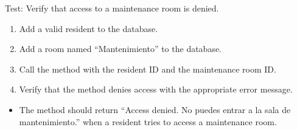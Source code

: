 \documentclass[letterpaper,10pt,english]{sphinxmanual}
\begin{document}
\begin{fulllineitems}
\label{\detokenize{test:test.test_room.test_access_room_maintenance_room}}
\pysigstartsignatures
\pysiglinewithargsret
{}
{}
{}
\pysigstopsignatures
\sphinxAtStartPar
Test: Verify that access to a maintenance room is denied.
\begin{description}
\begin{enumerate}
%
\item {} 
\sphinxAtStartPar
Add a valid resident to the database.

\item {} 
\sphinxAtStartPar
Add a room named “Mantenimiento” to the database.

\item {} 
\sphinxAtStartPar
Call the  method with the resident ID and the maintenance room ID.

\item {} 
\sphinxAtStartPar
Verify that the method denies access with the appropriate error message.

\end{enumerate}

\begin{itemize}
\item {} 
\sphinxAtStartPar
The method should return “Access denied. No puedes entrar a la sala de mantenimiento.”
when a resident tries to access a maintenance room.

\end{itemize}

\end{description}

\end{fulllineitems}

\end{document}
